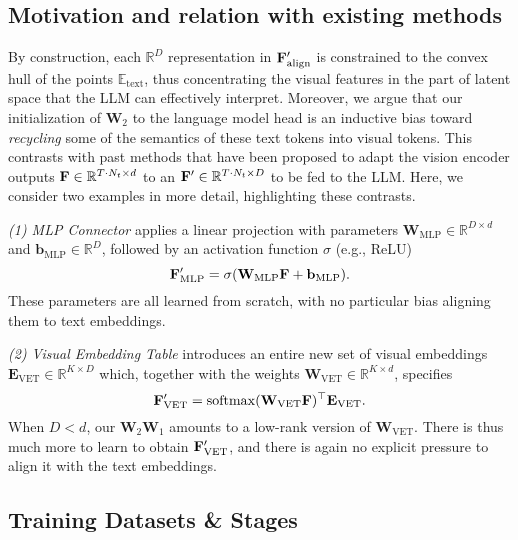 \subsection{Motivation and relation with existing methods}
By construction, each $\mathbb{R}^D$ representation in $\mathbf{F}_\text{align}^\prime$ is constrained to the %
convex hull of the points $\mathbb{E}_{\text{text}}$, thus concentrating the visual features in the part of latent space that the LLM can effectively interpret. 
Moreover, we argue that our initialization of $\mathbf{W}_2$ to the language model head is an inductive bias toward \emph{recycling} some of the semantics of these text tokens into visual tokens. 
This contrasts with past methods that have been proposed to adapt the vision encoder outputs $\mathbf{F} \in \mathbb{R}^{T \cdot N_t \times d}$ to an $\mathbf{F}^\prime \in \mathbb{R}^{T \cdot N_t \times D}$ to be fed to the LLM.
Here, we consider two examples in more detail, highlighting these contrasts.

\emph{(1) MLP Connector} \cite{liu2023llava} applies a linear projection with parameters $\mathbf{W}_{\text{MLP}} \in \mathbb{R}^{D \times d}$ and $\mathbf{b}_{\text{MLP}} \in \mathbb{R}^D$, followed by an activation function $\sigma$ (e.g., ReLU)
\[
\mathbf{F}_\text{MLP}^\prime = \sigma(\mathbf{W}_{\text{MLP}} \mathbf{F} + \mathbf{b}_{\text{MLP}}).
\]
These parameters are all learned from scratch, with no particular bias aligning them to text embeddings.

\emph{(2) Visual Embedding Table} \cite{ovis} introduces an entire new set of visual embeddings $\mathbf{E}_{\text{VET}} \in \mathbb{R}^{K \times D}$ which, together with the weights $\mathbf{W}_{\text{VET}} \in \mathbb{R}^{K\times d}$, specifies
\begin{equation}
\mathbf{F}_\text{VET}^\prime = \operatorname{softmax}( \mathbf{W}_{\text{VET}} \mathbf{F} )^\top \mathbf{E}_{\text{VET}} . \nonumber
\end{equation}
When $D < d$, our $\mathbf{W}_2 \mathbf{W}_1$ amounts to a low-rank version of $\mathbf{W}_{\text{VET}}$.
There is thus much more to learn to obtain $\mathbf{F}_\text{VET}^\prime$, and there is again no explicit pressure to align it with the text embeddings.












\subsection{Training Datasets \& Stages}\label{sec:trainin-datasets-stages}


